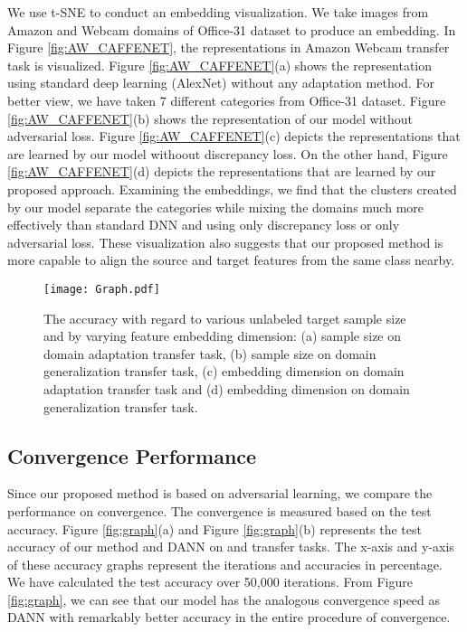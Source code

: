 \documentclass[review]{elsarticle}
\begin{document}
We use t-SNE \cite{vanDerMaaten2008} to conduct an embedding visualization. We take images from Amazon and Webcam domains of Office-31 dataset to produce an embedding.
In Figure \ref{fig:AW_CAFFENET}, the representations in Amazon  Webcam transfer task is visualized. Figure \ref{fig:AW_CAFFENET}(a) shows the representation using standard deep learning (AlexNet) without any adaptation method. For better view, we have taken 7 different categories from Office-31 dataset. Figure \ref{fig:AW_CAFFENET}(b) shows the representation of our model without adversarial loss. Figure \ref{fig:AW_CAFFENET}(c) depicts the representations that are learned by our model withoout discrepancy loss. On the other hand, Figure \ref{fig:AW_CAFFENET}(d) depicts the representations that are learned by our proposed approach. 
Examining the embeddings, we find that the clusters created by our model separate the categories while mixing the domains much more effectively than standard DNN and using only discrepancy loss or only adversarial loss. These visualization also suggests that our proposed method is more capable to align the source and target features from the same class nearby.


\begin{figure}
\begin{center}
\texttt{[image: Graph.pdf]}
\end{center}
   \caption{The accuracy with regard to various unlabeled target sample size and by varying feature embedding dimension: (a) sample size on  domain adaptation transfer task, (b) sample size on  domain generalization transfer task, (c) embedding dimension on  domain adaptation transfer task and (d) embedding dimension on  domain generalization transfer task.}
\label{fig:samplesize}
\end{figure}


\subsection{Convergence Performance}


Since our proposed method is based on adversarial learning, we compare the performance on convergence. The convergence is measured based on the test accuracy. Figure \ref{fig:graph}(a) and Figure \ref{fig:graph}(b) represents the test accuracy of our method and DANN \cite{pmlr-v37-ganin15} on  and  transfer tasks. The x-axis and y-axis of these accuracy graphs represent the iterations and accuracies in percentage. We have calculated the test accuracy over 50,000 iterations. From Figure \ref{fig:graph}, we can see that our model has the analogous convergence speed as DANN with remarkably better accuracy in the entire procedure of convergence. 
\end{document}
